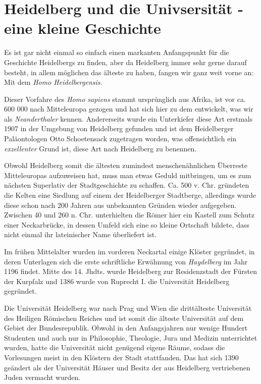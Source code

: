 
\section{Heidelberg und die Univsersität - eine kleine Geschichte}

Es ist gar nicht einmal so einfach einen markanten Anfangspunkt für die Geschichte Heidelbergs zu finden, aber da Heidelberg immer sehr gerne darauf besteht, in allem möglichen das älteste zu haben, fangen wir ganz weit vorne an: Mit dem \textit{Homo Heidelbergensis}.

Dieser Vorfahre des \textit{Homo sapiens} stammt ursprünglich aus Afrika, ist vor ca. 600 000 nach Mitteleuropa gezogen und hat sich hier zu dem entwickelt, was wir als \textit{Neanderthaler} kennen. Andererseits wurde ein Unterkiefer diese Art erstmals 1907 in der Umgebung von Heidelberg gefunden und ist dem Heidelberger Paläontologen Otto Schoetensack zugetragen worden, was offensichtlich ein \textit{exzellenter} Grund ist, diese Art nach Heidelberg zu benennen.

Obwohl Heidelberg somit die ältesten zumindest menschenähnlichen Überreste Mitteleuropas aufzuweisen hat, muss man etwas Geduld mitbringen, um es zum nächsten Superlativ der Stadtgeschichte zu schaffen. Ca. 500 v. Chr. gründeten die Kelten eine Siedlung auf einem der Heidelberger Stadtberge, allerdings wurde diese schon nach 200 Jahren aus unbekannten Gründen wieder aufgegeben. Zwischen 40 und 260 n. Chr. unterhielten die Römer hier ein Kastell zum Schutz einer Neckarbrücke, in dessen Umfeld sich eine so kleine Ortschaft bildete, dass nicht einmal ihr lateinischer Name überliefert ist.

Im frühen Mittelalter wurden im vorderen Neckartal einige Klöster gegründet, in deren Unterlagen sich die erste schriftliche Erwähnung von \textit{Haydelberg} im Jahr 1196 findet. Mitte des 14. Jhdts. wurde Heidelberg zur Residenzstadt der Fürsten der Kurpfalz und 1386 wurde von Ruprecht I. die Universität Heidelberg gegründet.

Die Universität Heidelberg war nach Prag und Wien die drittälteste Universität des Heiligen Römischen Reiches und ist somit die älteste Universität auf dem Gebiet der Bundesrepublik. Obwohl in den Anfangsjahren nur wenige Hundert Studenten und auch nur in Philosophie, Theologie, Jura und Medizin unterrichtet wurden, hatte die Universität nicht genügend eigene Räume, sodass die Vorlesungen meist in den Klöstern der Stadt stattfanden. Das hat sich 1390 geändert als der Universität Häuser und Besitz der aus Heidelberg vertriebenen Juden vermacht wurden.

